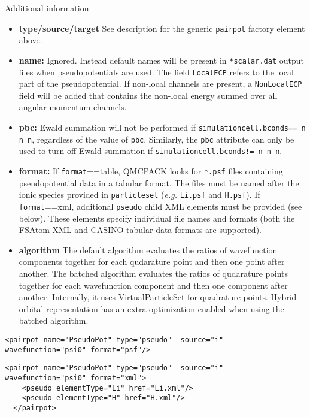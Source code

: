 Additional information:
\begin{itemize}
  \item{\textbf{type/source/target} See description for the generic \texttt{pairpot} factory element above.}
  \item{\textbf{name:} Ignored.  Instead default names will be present in \texttt{*scalar.dat} output files when pseudopotentials are used.  The field \texttt{LocalECP} refers to the local part of the pseudopotential.  If non-local channels are present, a \texttt{NonLocalECP} field will be added that contains the non-local energy summed over all angular momentum channels.}
  \item{\textbf{pbc:} Ewald summation will not be performed if \texttt{simulationcell.bconds== n n n}, regardless of the value of \texttt{pbc}.  Similarly, the \texttt{pbc} attribute can only be used to turn off Ewald summation if \texttt{simulationcell.bconds!= n n n}.}
  \item{\textbf{format:}  If \texttt{format}==table, QMCPACK looks for \texttt{*.psf} files containing pseudopotential data in a tabular format.  The files must be named after the ionic species provided in \texttt{particleset} (\emph{e.g.} \texttt{Li.psf} and \texttt{H.psf}). If \texttt{format}==xml, additional \texttt{pseudo} child XML elements must be provided (see below).  These elements specify individual file names and formats (both the FSAtom XML and CASINO tabular data formats are supported). }
  \item{\textbf{algorithm} The default algorithm evaluates the ratios of wavefunction components together for each qudarature point and then one point after another. The batched algorithm evaluates the ratios of qudarature points together for each wavefunction component and then one component after another. Internally, it uses VirtualParticleSet for quadrature points. Hybrid orbital representation has an extra optimization enabled when using the batched algorithm.}
\end{itemize}


\begin{lstlisting}[caption=XML element for pseudopotential electron-ion interaction (psf files).]
  <pairpot name="PseudoPot" type="pseudo"  source="i" wavefunction="psi0" format="psf"/>
\end{lstlisting}

\begin{lstlisting}[caption=XML element for pseudopotential electron-ion interaction (xml files).]
  <pairpot name="PseudoPot" type="pseudo"  source="i" wavefunction="psi0" format="xml">
    <pseudo elementType="Li" href="Li.xml"/>
    <pseudo elementType="H" href="H.xml"/>
  </pairpot>
\end{lstlisting}

